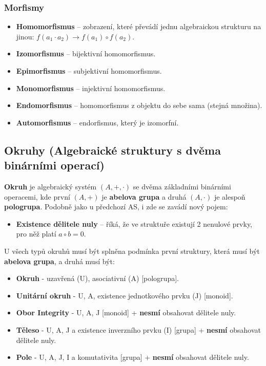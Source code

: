 \subsubsection{Morfismy}
\begin{itemize}
\item \textbf{Homomorfismus} -- zobrazení, které převádí jednu algebraickou strukturu na jinou: $f(a_1 \cdot a_2) \rightarrow f(a_1) \circ f(a_2)$.
\item \textbf{Izomorfismus} -- bijektivní homomorfismus.
\item \textbf{Epimorfismus} -- subjektivní homomorfismus.
\item \textbf{Monomorfismus} -- injektivní homomorfismus.
\item \textbf{Endomorfismus} -- homomorfismus z objektu do sebe sama (stejná množina).
\item \textbf{Automorfismus} -- endorfismus, který je izomorfní.
\end{itemize}

\subsection{Okruhy (Algebraické struktury s dvěma binárními operací)}
\textbf{Okruh} je algebraický systém $(A, +, \cdot)$ se dvěma základními binárními operacemi, kde první $(A, +)$ je \textbf{abelova grupa} a druhá $(A, \cdot)$ je alespoň \textbf{pologrupa}. Podobně jako u předchozí AS, i zde se zavádí nový pojem:
\begin{itemize}
\item \textbf{Existence dělitele nuly} -- říká, že ve struktuře existují 2 nenulové prvky, pro něž platí $a \circ b = 0$.
\end{itemize}
U všech typů okruhů musí být splněna podmínka první struktury, která musí být \textbf{abelova grupa}, a druhá musí být:
\begin{itemize}
\item \textbf{Okruh} - uzavřená ({U}), asociativní ({A}) [pologrupa].
\item \textbf{Unitární okruh} - {U}, {A}, existence jednotkového prvku (J) [monoid].
\item \textbf{Obor Integrity} - {U}, {A}, {J} [monoid] + \textbf{nesmí} obsahovat dělitele nuly.
\item \textbf{Těleso} - {U}, {A}, {J} a existence inverzního prvku (I) [grupa] + \textbf{nesmí} obsahovat dělitele nuly.
\item \textbf{Pole} - {U}, {A}, {J}, {I} a komutativita [grupa] + \textbf{nesmí} obsahovat dělitele nuly.
\end{itemize} 